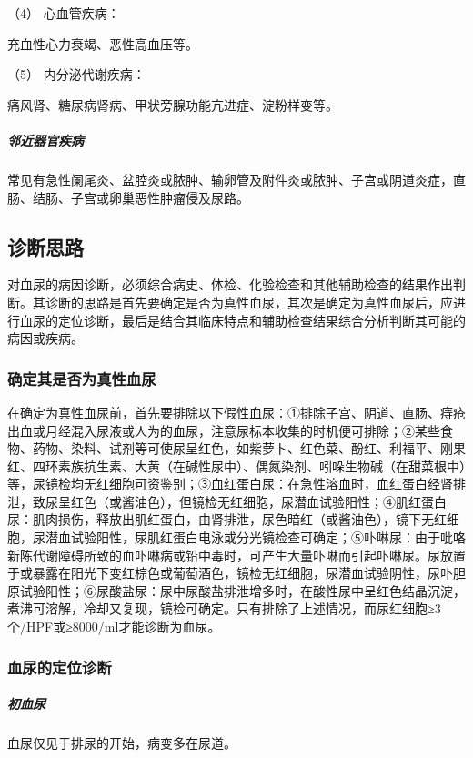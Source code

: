 \hypertarget{text00037.htmlux5cux23CHP1-15-1-2-4}{}
（4） 心血管疾病：

充血性心力衰竭、恶性高血压等。

\hypertarget{text00037.htmlux5cux23CHP1-15-1-2-5}{}
（5） 内分泌代谢疾病：

痛风肾、糖尿病肾病、甲状旁腺功能亢进症、淀粉样变等。

\subparagraph{邻近器官疾病}

常见有急性阑尾炎、盆腔炎或脓肿、输卵管及附件炎或脓肿、子宫或阴道炎症，直肠、结肠、子宫或卵巢恶性肿瘤侵及尿路。

\subsection{诊断思路}

对血尿的病因诊断，必须综合病史、体检、化验检查和其他辅助检查的结果作出判断。其诊断的思路是首先要确定是否为真性血尿，其次是确定为真性血尿后，应进行血尿的定位诊断，最后是结合其临床特点和辅助检查结果综合分析判断其可能的病因或疾病。

\subsubsection{确定其是否为真性血尿}

在确定为真性血尿前，首先要排除以下假性血尿：①排除子宫、阴道、直肠、痔疮出血或月经混入尿液或人为的血尿，注意尿标本收集的时机便可排除；②某些食物、药物、染料、试剂等可使尿呈红色，如紫萝卜、红色菜、酚红、利福平、刚果红、四环素族抗生素、大黄（在碱性尿中）、偶氮染剂、吲哚生物碱（在甜菜根中）等，尿镜检均无红细胞可资鉴别；③血红蛋白尿：在急性溶血时，血红蛋白经肾排泄，致尿呈红色（或酱油色），但镜检无红细胞，尿潜血试验阳性；④肌红蛋白尿：肌肉损伤，释放出肌红蛋白，由肾排泄，尿色暗红（或酱油色），镜下无红细胞，尿潜血试验阳性，尿肌红蛋白电泳或分光镜检查可确定；⑤卟啉尿：由于吡咯新陈代谢障碍所致的血卟啉病或铅中毒时，可产生大量卟啉而引起卟啉尿。尿放置于或暴露在阳光下变红棕色或葡萄酒色，镜检无红细胞，尿潜血试验阴性，尿卟胆原试验阳性；⑥尿酸盐尿：尿中尿酸盐排泄增多时，在酸性尿中呈红色结晶沉淀，煮沸可溶解，冷却又复现，镜检可确定。只有排除了上述情况，而尿红细胞≥3个/HPF或≥8000/ml才能诊断为血尿。

\subsubsection{血尿的定位诊断}

\subparagraph{初血尿}

血尿仅见于排尿的开始，病变多在尿道。

